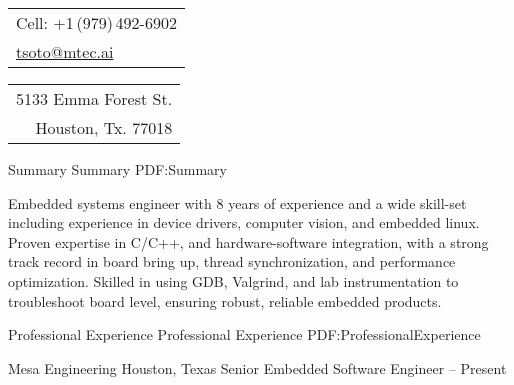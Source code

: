 \documentclass[letterpaper,MMMyyyy,nonstopmode]{simpleresumecv}
\newcommand{\CVAuthor}{Timothy Soto}
\begin{document}

\Title{\CVAuthor}

\noindent
\begin{tabular}[t]{@{}l}
    Cell: +1\,(979)\,492-6902 \\
    \href{mailto:tsoto@mtec.ai}
    {tsoto@mtec.ai}
\end{tabular}
\hfill%
\begin{tabular}[t]{r@{}}
    5133 Emma Forest St. \\ Houston, Tx. 77018
\end{tabular}

\begin{Body}
    \Entry

    \Section
    {Summary}
    {Summary}
    {PDF:Summary}

    Embedded systems engineer with 8 years of experience and a wide skill-set including experience in device drivers, computer vision, and embedded linux. Proven expertise in C/C++, and hardware-software integration, with a strong track record in board bring up, thread synchronization, and performance optimization. Skilled in using GDB, Valgrind, and lab instrumentation to troubleshoot board level, ensuring robust, reliable embedded products.


    \Section
    {Professional Experience}
    {Professional Experience}
    {PDF:ProfessionalExperience}

    \SubSection
    {Mesa Engineering}
    {Houston, Texas}
    {Senior Embedded Software Engineer}
    { -- Present}


\end{Body}
\end{document}
